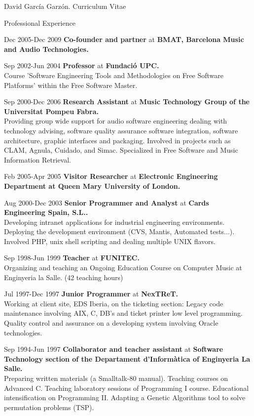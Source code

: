 \documentclass{article}
\begin{document}
\begin{cv}{David García Garzón. Curriculum Vitae}
\begin{cvlist}{Professional Experience}
\item[Dec 2005-Dec 2009]
{\bf Co-founder and partner} at
{\bf BMAT, Barcelona Music and Audio Technologies.}\\


\item[Sep 2002-Jun 2004]
{\bf Professor} at
{\bf Fundació UPC.}\\
Course 'Software Engineering Tools and Methodologies on
Free Software Platforms' within the Free Software Master.


\item[Sep 2000-Dec 2006]
{\bf Research Assistant} at
{\bf Music Technology Group of the Universitat Pompeu Fabra.}\\
Providing group wide support for audio software engineering
dealing with technology advising, software quality assurance
software integration, software architecture, graphic interfaces and packaging.
Involved in projects such as CLAM, Agnula, Cuidado, and Simac.
Specialized in Free Software and Music Information Retrieval.


\item[Feb 2005-Apr 2005]
{\bf Visitor Researcher} at
{\bf Electronic Engineering Department at Queen Mary University of London.}\\


\item[Aug 2000-Dec 2003]
{\bf Senior Programmer and Analyst} at
{\bf Cards Engineering Spain, S.L..}\\
Developing intranet applications for industrial engineering environments.
Deploying the development environment (CVS, Mantis, Automated tests...).
Involved PHP, unix shell scripting and dealing multiple UNIX flavors.


\item[Sep 1998-Jun 1999]
{\bf Teacher} at
{\bf FUNITEC.}\\
Organizing and teaching an Ongoing Education Course on Computer Music at Enginyeria la Salle. (42 teaching hours)

\item[Jul 1997-Dec 1997]
{\bf Junior Programmer} at
{\bf NexTReT.}\\
Working at client site, EDS Iberia, on the ticketing section:
Legacy code maintenance involving AIX, C, DB’s and
ticket printer low level programming.
Quality control and assurance on a developing system involving Oracle technologies.


\item[Sep 1994-Jun 1997]
{\bf Collaborator and teacher assistant} at
{\bf Software Technology section of the Departament d'Informàtica of Enginyeria La Salle.}\\
Preparing written materials (a Smalltalk-80 manual).
Teaching courses on Advanced C.
Teaching laboratory sessions of Programming I course.
Educational intensification on Programming II.
Adapting a Genetic Algorithms tool to solve permutation problems (TSP).


\end{cvlist}
\end{cv}
\end{document}
